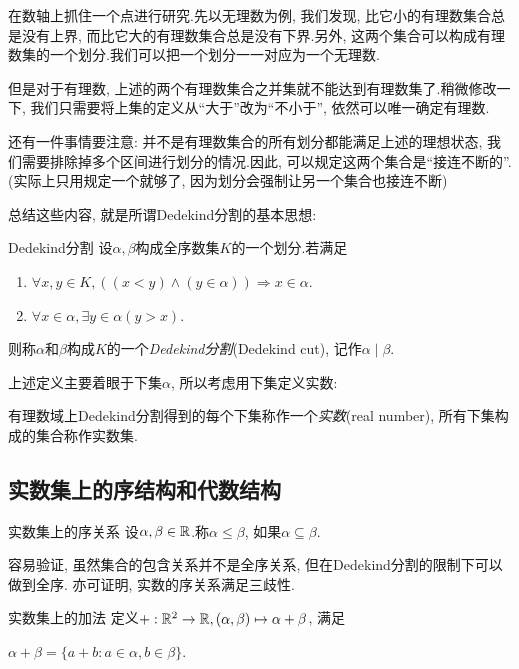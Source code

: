 在数轴上抓住一个点进行研究.先以无理数为例, 我们发现, 比它小的有理数集合总是没有上界, 而比它大的有理数集合总是没有下界.另外, 这两个集合可以构成有理数集的一个划分.我们可以把一个划分一一对应为一个无理数.

但是对于有理数, 上述的两个有理数集合之并集就不能达到有理数集了.稍微修改一下, 我们只需要将上集的定义从“大于”改为“不小于”, 依然可以唯一确定有理数.

还有一件事情要注意: 并不是有理数集合的所有划分都能满足上述的理想状态, 我们需要排除掉多个区间进行划分的情况.因此, 可以规定这两个集合是“接连不断的”. (实际上只用规定一个就够了, 因为划分会强制让另一个集合也接连不断)

总结这些内容, 就是所谓Dedekind分割的基本思想: 

\begin{definition}{Dedekind分割}
	设$\alpha , \beta$构成全序数集$K$的一个划分.若满足
	\begin{enumerate}
		\item $\forall x, y \in K, ((x < y) \wedge (y \in \alpha)) \Rightarrow x \in \alpha$.
		\item $\forall x \in \alpha , \exists y \in \alpha (y>x)$.
	\end{enumerate}
	则称$\alpha$和$\beta$构成$K$的一个\textit{Dedekind分割}(Dedekind cut), 记作$\alpha \mid \beta$. 
\end{definition}

上述定义主要着眼于下集$\alpha$, 所以考虑用下集定义实数: 

\begin{definition}{}
	有理数域上Dedekind分割得到的每个下集称作一个\textit{实数}(real number), 所有下集构成的集合称作实数集.
\end{definition}

\subsection{实数集上的序结构和代数结构}

\begin{definition}{实数集上的序关系}
	设$\alpha , \beta \in \mathbb{R}$.称$\alpha \leq \beta$, 如果$\alpha \subseteq \beta$.
\end{definition}

容易验证, 虽然集合的包含关系并不是全序关系, 但在Dedekind分割的限制下可以做到全序. 亦可证明, 实数的序关系满足三歧性. 

\begin{definition}{实数集上的加法}
	定义$+: \mathbb{R} ^2 \to \mathbb{R} , (\alpha , \beta) \mapsto \alpha + \beta$, 满足
	\begin{center}
		$\alpha + \beta = \{ a+b: a \in \alpha , b \in \beta \}.$
	\end{center}
\end{definition}

